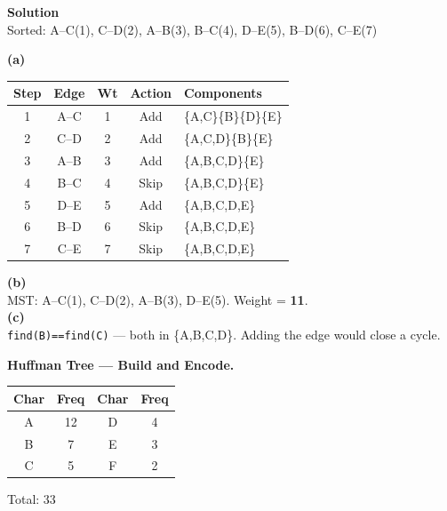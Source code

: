 \documentclass[12pt, addpoints]{exam}
\makeatletter
\newlength{\solindent}\setlength{\solindent}{0.5in}
\renewenvironment{solution}[1][\unanswered]{%
  \def\@solvspace{#1}%
  \ifprintanswers
    \par\smallskip
    \begin{adjustwidth}{\solindent}{\solindent}
    \begin{mdframed}[backgroundcolor=SolutionColor, linewidth=0.4pt,
      linecolor=gray!60, innerleftmargin=5pt, innerrightmargin=5pt,
      innertopmargin=4pt, innerbottommargin=4pt, skipabove=0pt, skipbelow=0pt]%
  \else
    \setbox\z@\vbox\bgroup
  \fi
}{%
  \ifprintanswers
    \end{mdframed}%
    \end{adjustwidth}%
    \par\smallskip
  \else
    \egroup
    \ifdim\ht\z@>\z@\vspace{\ht\z@}\else\vspace{\@solvspace}\fi
  \fi
}
\makeatother
\begin{document}
\begin{questions}
\begin{solution}

  {\large \textbf{Solution}}\\

  Sorted: A--C(1), C--D(2), A--B(3), B--C(4), D--E(5), B--D(6), C--E(7)

  \textbf{(a)}\\

  \begin{tabular}{|c|c|c|c|l|}\hline
  Step&Edge&Wt&Action&Components\\\hline
  1&A--C&1&Add&\{A,C\}\{B\}\{D\}\{E\}\\\hline
  2&C--D&2&Add&\{A,C,D\}\{B\}\{E\}\\\hline
  3&A--B&3&Add&\{A,B,C,D\}\{E\}\\\hline
  4&B--C&4&Skip&\{A,B,C,D\}\{E\}\\\hline
  5&D--E&5&Add&\{A,B,C,D,E\}\\\hline
  6&B--D&6&Skip&\{A,B,C,D,E\}\\\hline
  7&C--E&7&Skip&\{A,B,C,D,E\}\\\hline
  \end{tabular}

    \textbf{(b)}\\

  MST: A--C(1), C--D(2), A--B(3), D--E(5). Weight = \textbf{11}.\\

  \textbf{(c)}\\

  \texttt{find(B)==find(C)} — both in \{A,B,C,D\}. Adding the edge would close a cycle.

\end{solution}

\newpage
\question[10]
\textbf{Huffman Tree — Build and Encode.}

\begin{center}
\renewcommand{\arraystretch}{1.2}
\begin{tabular}{|c|c||c|c|}
  \hline
  \textbf{Char} & \textbf{Freq} & \textbf{Char} & \textbf{Freq}\\\hline
  A & 12 & D & 4 \\\hline
  B &  7 & E & 3 \\\hline
  C &  5 & F & 2 \\\hline
\end{tabular}
\quad Total: 33
\end{center}


\end{questions}
\end{document}

